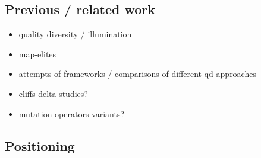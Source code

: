 \documentclass[sigconf, anonymous=false]{acmart}
\begin{document}
\subsection{Previous / related work}
\begin{itemize}
\item quality diversity / illumination \cite{Lehman2011, Mouret2015}
\item map-elites \cite{Mouret2015}
\item attempts of frameworks / comparisons of different qd approaches \cite{Pugh2016, Cully2017}
\item cliffs delta studies?
\item mutation operators variants?
\end{itemize}


\subsection{Positioning}
\end{document}
